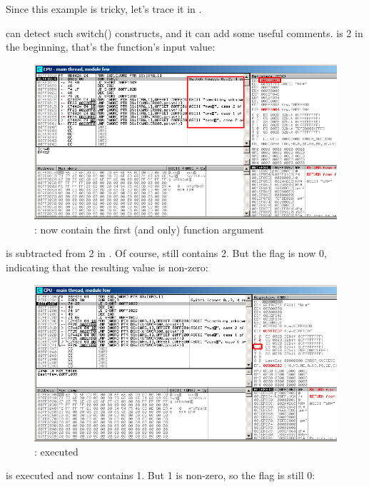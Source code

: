﻿\clearpage
\myparagraph{\olly}

Since this example is tricky, let's trace it in \olly.

\olly can detect such switch() constructs, and it can add some useful comments.
\EAX is 2 in the beginning, that's the function's input value: 

\begin{figure}[H]
\centering
\includegraphics[scale=\FigScale]{patterns/08_switch/1_few/olly1.png}
\caption{\olly: \EAX 
now contain the first (and only) function argument}
\label{fig:switch_few_olly1}
\end{figure}

 is subtracted from 2 in \EAX. 
Of course, \EAX still contains 2.
But the \ZF flag is now 0, indicating that the resulting value is non-zero:

\begin{figure}[H]
\centering
\includegraphics[scale=\FigScale]{patterns/08_switch/1_few/olly2.png}
\caption{\olly: \SUB executed}
\label{fig:switch_few_olly2}
\end{figure}

\clearpage
\DEC is executed and \EAX now contains 1. 
But 1 is non-zero, so the \ZF flag is still 0:

